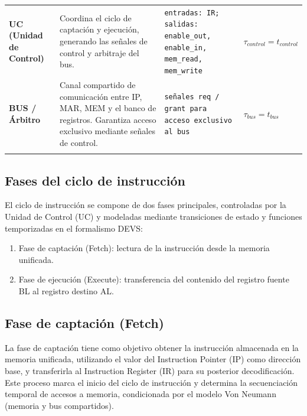 \documentclass[12pt,oneside]{templates/unerthesis}
\begin{document}
\begin{table}[!h]
{\begin{tabular}[t]{>{\raggedright\arraybackslash}p{5cm}|>{\raggedright\arraybackslash}p{8cm}>{\raggedright\arraybackslash}p{8cm}>{\raggedright\arraybackslash}p{3cm}}
\addlinespace[10pt]
\textbf{UC (Unidad de Control)} & Coordina el ciclo de captación y ejecución, generando las señales de control y arbitraje del bus. & \texttt{entradas: IR; salidas: enable\_out, enable\_in, mem\_read, mem\_write} & \textbf{$\tau_{control} = t_{control}$}\\
\addlinespace[10pt]
\textbf{BUS / Árbitro} & Canal compartido de comunicación entre IP, MAR, MEM y el banco de registros. Garantiza acceso exclusivo mediante señales de control. & \texttt{señales req / grant para acceso exclusivo al bus} & \textbf{$\tau_{bus} = t_{bus}$}\\
\addlinespace[10pt]
\bottomrule
\end{tabular}}
\end{table}

\hypertarget{fases-del-ciclo-de-instrucciuxf3n}{%
\subsection{Fases del ciclo de instrucción}\label{fases-del-ciclo-de-instrucciuxf3n}}

El ciclo de instrucción se compone de dos fases principales, controladas por la Unidad de Control (UC) y modeladas mediante transiciones de estado y funciones temporizadas en el formalismo DEVS:

\begin{enumerate}
\def\labelenumi{\arabic{enumi}.}
\item
  Fase de captación (Fetch): lectura de la instrucción desde la memoria unificada.
\item
  Fase de ejecución (Execute): transferencia del contenido del registro fuente BL al registro destino AL.
\end{enumerate}

\hypertarget{fase-de-captaciuxf3n-fetch}{%
\subsection{Fase de captación (Fetch)}\label{fase-de-captaciuxf3n-fetch}}

La fase de captación tiene como objetivo obtener la instrucción almacenada en la memoria unificada, utilizando el valor del Instruction Pointer (IP) como dirección base, y transferirla al Instruction Register (IR) para su posterior decodificación. Este proceso marca el inicio del ciclo de instrucción y determina la secuenciación temporal de accesos a memoria, condicionada por el modelo Von Neumann (memoria y bus compartidos).
\end{document}
